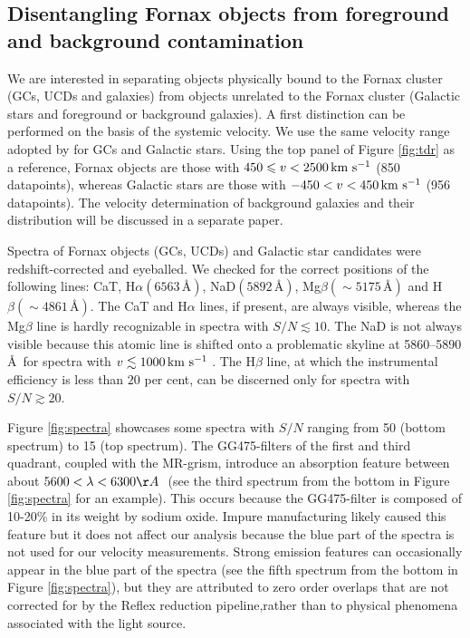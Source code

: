 \documentclass[useAMS,usenatbib]{mn2e}
\newcommand{\kms}{\mbox{\,km~s$^{-1}$}}
\begin{document}
\subsection{Disentangling Fornax objects from foreground and background contamination}

We are interested in separating objects physically bound to the Fornax cluster (GCs, UCDs and galaxies) from objects unrelated to the Fornax cluster (Galactic stars and foreground or background galaxies). A first distinction can be performed on the basis of the systemic velocity. We use the same velocity range adopted by \cite{Schuberth} for GCs and Galactic stars.
Using the top panel of Figure \ref{fig:tdr} as a reference, Fornax objects are those with $450 \le v <2500 \kms$ (850 datapoints), whereas Galactic stars are those with $-450<v<450 \kms$ (956 datapoints). The velocity determination of background galaxies and their distribution will be discussed in a separate paper.

Spectra of Fornax objects (GCs, UCDs) and Galactic star candidates were redshift-corrected and eyeballed. We checked for the correct positions of the following lines: CaT, H$\alpha (6563 \, \mbox{\AA})$, NaD$(5892 \, \mbox{\AA})$, Mg$\beta (\sim 5175 \, \mbox{\AA})$ and H$\beta (\sim 4861\, \mbox{\AA})$. The CaT and H$\alpha$ lines, if present, are always visible, whereas the Mg$\beta$ line is hardly recognizable in spectra with $S/N \lesssim 10$. The NaD is not always visible because this atomic line is shifted onto a problematic skyline at 5860--5890 \AA\ for spectra with $v \lesssim 1000\kms$ . The H$\beta$ line, at which the instrumental efficiency is less than $20$ per cent, can be discerned only for spectra with $S/N \gtrsim 20 $.

Figure \ref{fig:spectra} showcases some spectra with $S/N$ ranging from 50 (bottom spectrum) to 15 (top spectrum). 
The GG475-filters of the first and third quadrant, coupled with the MR-grism, introduce an absorption feature between about $5600 < \lambda < 6300 \AA\ $ (see the third spectrum from the bottom in Figure \ref{fig:spectra} for an example). This occurs because the GG475-filter is composed of 10-20\% in its weight by sodium oxide. Impure manufacturing likely caused this feature but it does not affect our analysis because the blue part of the spectra is not used for our velocity measurements. Strong emission features can occasionally appear in the blue part of the spectra (see the fifth spectrum from the bottom in Figure \ref{fig:spectra}), but they are attributed to zero order overlaps that are not corrected for by the Reflex reduction pipeline,rather than to physical phenomena associated with the light source. 
\end{document}
